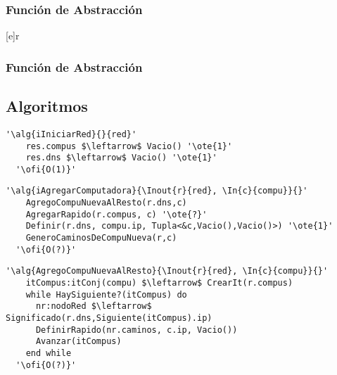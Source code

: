   \subsubsection{Función de Abstracción}

   [e]{r}{
    }
\subsubsection{Función de Abstracción}




\subsection{Algoritmos}
\lstset{style=alg}
\begin{lstlisting}[mathescape]
  '\alg{iIniciarRed}{}{red}'
    res.compus $\leftarrow$ Vacio() '\ote{1}'
    res.dns $\leftarrow$ Vacio() '\ote{1}'
  '\ofi{O(1)}'
\end{lstlisting}

\begin{lstlisting}[mathescape]
  '\alg{iAgregarComputadora}{\Inout{r}{red}, \In{c}{compu}}{}'
    AgregoCompuNuevaAlResto(r.dns,c)
    AgregarRapido(r.compus, c) '\ote{?}'
    Definir(r.dns, compu.ip, Tupla<&c,Vacio(),Vacio()>) '\ote{1}'
    GeneroCaminosDeCompuNueva(r,c)
  '\ofi{O(?)}'
\end{lstlisting}

\begin{lstlisting}[mathescape]
  '\alg{AgregoCompuNuevaAlResto}{\Inout{r}{red}, \In{c}{compu}}{}'
    itCompus:itConj(compu) $\leftarrow$ CrearIt(r.compus)
    while HaySiguiente?(itCompus) do                                                    
      nr:nodoRed $\leftarrow$ Significado(r.dns,Siguiente(itCompus).ip)
      DefinirRapido(nr.caminos, c.ip, Vacio())
      Avanzar(itCompus)
    end while  
  '\ofi{O(?)}'
\end{lstlisting}

